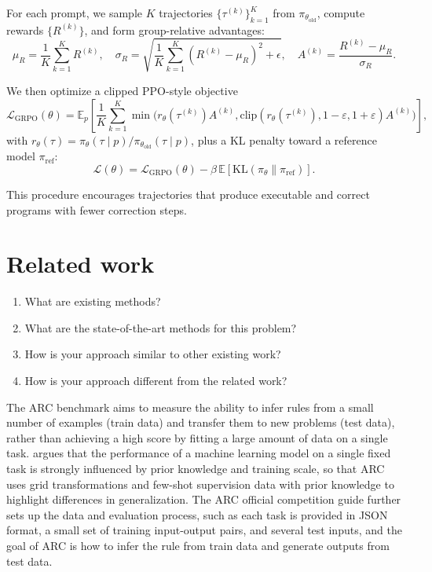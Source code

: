 \documentclass[11pt,letterpaper]{article}
\begin{document}
For each prompt, we sample $K$ trajectories $\{\tau^{(k)}\}_{k=1}^K$ from $\pi_{\theta_{\text{old}}}$, compute rewards $\{R^{(k)}\}$, and form group-relative advantages:
\[
\mu_R = \frac{1}{K}\sum_{k=1}^K R^{(k)}, \quad
\sigma_R = \sqrt{\frac{1}{K}\sum_{k=1}^K (R^{(k)}-\mu_R)^2 + \epsilon}, \quad
A^{(k)} = \frac{R^{(k)}-\mu_R}{\sigma_R}.
\]

We then optimize a clipped PPO-style objective
\[
\mathcal{L}_{\text{GRPO}}(\theta)=
\mathbb{E}_{p}\!\left[
\frac{1}{K}\sum_{k=1}^K
\min\!\big(
r_\theta(\tau^{(k)})A^{(k)},
\text{clip}(r_\theta(\tau^{(k)}),1-\varepsilon,1+\varepsilon)A^{(k)}
\big)
\right],
\]
with $r_\theta(\tau)=\pi_\theta(\tau\mid p)/\pi_{\theta_{\text{old}}}(\tau\mid p)$, plus a KL penalty toward a reference model $\pi_{\text{ref}}$:
\[
\mathcal{L}(\theta)=\mathcal{L}_{\text{GRPO}}(\theta)-\beta\,\mathbb{E}[\mathrm{KL}(\pi_\theta\|\pi_{\text{ref}})].
\]

This procedure encourages trajectories that produce executable and correct programs with fewer correction steps.





\section{Related work}
{\color{red}
\begin{enumerate}
    \item What are existing methods?
    \item What are the state-of-the-art methods for this problem?
    \item How is your approach similar to other existing work?
    \item How is your approach different from the related work?
\end{enumerate}
}

The ARC benchmark aims to measure the ability to infer rules from a small number of examples (train data) and transfer them to new problems (test data), rather than achieving a high score by fitting a large amount of data on a single task.
\citet{chollet2019measureintelligence} argues that the performance of a machine learning model on a single fixed task is strongly influenced by prior knowledge and training scale, so that ARC uses grid transformations and few-shot supervision data with prior knowledge to highlight differences in generalization.
The ARC official competition guide further sets up the data and evaluation process, such as each task is provided in JSON format, a small set of training input-output pairs, and several test inputs, and the goal of ARC is how to infer the rule from train data and generate outputs from test data\citep{arcprize_guide}.
\end{document}
